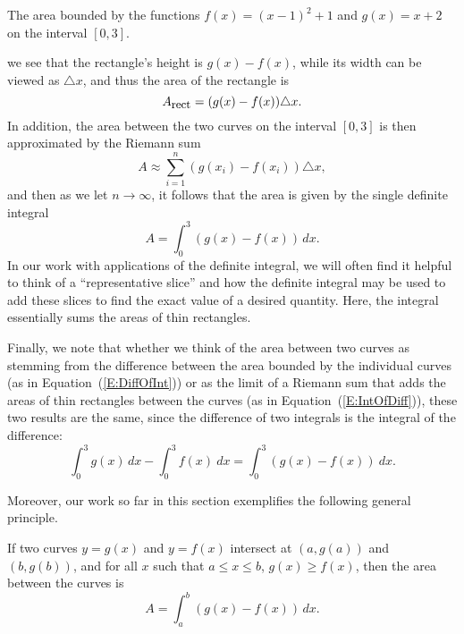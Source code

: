 \begin{marginfigure} %
\caption{The area bounded by the functions $f(x) = (x-1)^2 + 1$ and $g(x) = x+2$ on the interval $[0,3]$.} \label{F:6.1.PA1revisited2}
\end{marginfigure}

we see that the rectangle's height is $g(x) - f(x)$, while its width can be viewed as $\triangle x$, and thus the area of the rectangle is
\[ A_{\mbox{\small{rect}}} = (g(x) - f(x)) \triangle x. \]
In addition, the area between the two curves on the interval $[0,3]$ is then approximated by the Riemann sum
\[ A \approx \sum_{i=1}^{n} (g(x_i) - f(x_i)) \triangle x, \]
and then as we let $n \to \infty$, it follows that the area is given by the single definite integral
\begin{equation} \label{E:IntOfDiff} %
A = \int_0^3 (g(x) - f(x)) \, dx.
\end{equation}
In our work with applications of the definite integral, we will often find it helpful to think of a ``representative slice'' and how the definite integral may be used to add these slices to find the exact value of a desired quantity.  Here, the integral essentially sums the areas of thin rectangles.

Finally, we note that whether we think of the area between two curves as stemming from the difference between the area bounded by the individual curves (as in Equation~(\ref{E:DiffOfInt})) or as the limit of a Riemann sum that adds the areas of thin rectangles between the curves (as in Equation~(\ref{E:IntOfDiff})), these two results are the same, since the difference of two integrals is the integral of the difference:
\[ \int_0^3 g(x) \, dx -  \int_0^3 f(x) \ dx = \int_0^3 (g(x) - f(x)) \ dx. \]

Moreover, our work so far in this section exemplifies the following general principle.

\concept{} %
{ If two curves $y = g(x)$ and $y = f(x)$ intersect at $(a,g(a))$ and $(b,g(b))$, and for all $x$ such that $a \le x \le b$, $g(x) \ge f(x)$, then the area between the curves is 
$$A = \int_a^b (g(x) - f(x)) \, dx.$$
} %





